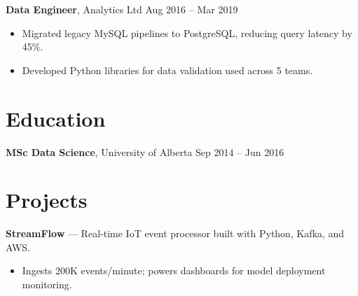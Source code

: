 \documentclass[10pt, letterpaper]{article}
\begin{document}
\textbf{Data Engineer}, Analytics Ltd \hfill Aug 2016 -- Mar 2019
\begin{itemize}[leftmargin=*]
    \item Migrated legacy MySQL pipelines to PostgreSQL, reducing query latency by 45\%.
    \item Developed Python libraries for data validation used across 5 teams.
\end{itemize}

\section*{Education}
\textbf{MSc Data Science}, University of Alberta \hfill Sep 2014 -- Jun 2016

\section*{Projects}
\textbf{StreamFlow} — Real-time IoT event processor built with Python, Kafka, and AWS.
\begin{itemize}[leftmargin=*]
    \item Ingests 200K events/minute; powers dashboards for model deployment monitoring.
\end{itemize}
\end{document}
